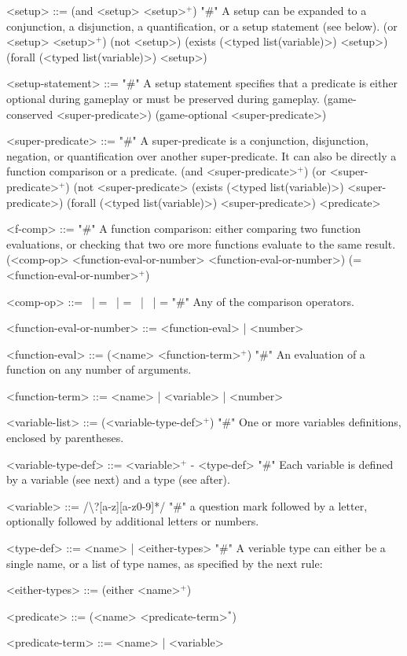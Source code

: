 \documentclass{article}
\begin{document}
\begin{grammar}
<setup> ::= (and <setup> <setup>$^+$) "#" A setup can be expanded to a conjunction, a disjunction, a quantification, or a setup statement (see below).
    \alt (or <setup> <setup>$^+$) 
    \alt (not <setup>)
    \alt (exists (<typed list(variable)>) <setup>)
    \alt (forall (<typed list(variable)>) <setup>) 

<setup-statement> ::= "#" A setup statement specifies that a predicate is either optional during gameplay or must be preserved during gameplay.
    \alt (game-conserved <super-predicate>) 
    \alt (game-optional <super-predicate>)

<super-predicate> ::= "#" A super-predicate is a conjunction, disjunction, negation, or quantification over another super-predicate. It can also be directly a function comparison or a predicate.
    \alt (and <super-predicate>$^+$) 
    \alt (or <super-predicate>$^+$) 
    \alt (not <super-predicate> 
    \alt (exists (<typed list(variable)>) <super-predicate>) 
    \alt (forall (<typed list(variable)>) <super-predicate>) 
    \alt <predicate>


<f-comp> ::= "#" A function comparison: either comparing two function evaluations, or checking that two ore more functions evaluate to the same result.
    \alt (<comp-op> <function-eval-or-number> <function-eval-or-number>) 
    \alt (= <function-eval-or-number>$^+$)
    
<comp-op> ::=  \textlangle \ | \textlangle = \ | = \ | \textrangle \ | \textrangle = "#" Any of the comparison operators.

<function-eval-or-number> ::= <function-eval> | <number> 

<function-eval> ::= (<name> <function-term>$^+$) "#" An evaluation of a function on any number of arguments.

<function-term> ::= <name> | <variable> | <number> 

<variable-list> ::= (<variable-type-def>$^+$) "#" One or more variables definitions, enclosed by parentheses.

<variable-type-def> ::= <variable>$^+$ - <type-def> "#" Each variable is defined by a variable (see next) and a type (see after).

<variable> ::= /\textbackslash?[a-z][a-z0-9]*/  "#" a question mark followed by a letter, optionally followed by additional letters or numbers.

<type-def> ::= <name> | <either-types> "#" A veriable type can either be a single name, or a list of type names, as specified by the next rule:

<either-types> ::= (either <name>$^+$)

<predicate> ::= (<name> <predicate-term>$^*$)

<predicate-term> ::= <name> | <variable>


\end{grammar}
\end{document}
